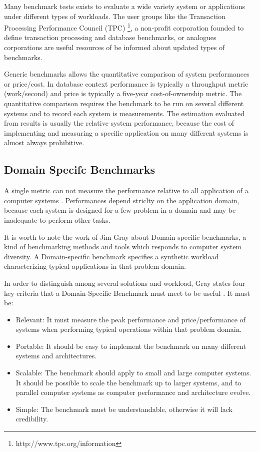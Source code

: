 Many benchmark tests exists to evaluate a wide variety system or applications under different types of workloads. The user groups like the Transaction Processing Performance Council (TPC) \footnote{http://www.tpc.org/information},  a non-profit corporation founded to define transaction processing and database benchmarks, or analogues corporations are useful resources of be informed about updated types of benchmarks. 

Generic benchmarks allows the quantitative comparison of system performances or price/cost. In database context performance is typically a throughput metric (work/second) and price is typically a five-year cost-of-ownership metric. The quantitative comparison requires the benchmark to be run on several different systems and to record each system is measurements.  The estimation evaluated from results is usually the relative system performance, because the cost of implementing and measuring a specific application on many different systems is almost always prohibitive.

\subsection{Domain Specifc Benchmarks}  \label{sec:tcp}

A single metric can not measure the performance relative to all application of a computer systems \cite{DBLP:books/mk/Gray93}. Performances depend striclty on the application domain, because each system is designed for a few problem in a domain and may be inadequate to perform other tasks.

It is worth to note the work of Jim Gray about Domain-specific benchmarks, a kind of benchmarking methods and tools  which responds to computer system diversity. A Domain-specific benchmark specifies a synthetic workload characterizing typical applications in that problem domain. 

In order to distinguish among several solutions and workload, Gray states four key criteria that a Domain-Specific Benchmark must meet to be useful \cite{DBLP:books/mk/Gray93}. It must be:
\begin{itemize}
\item Relevant: It must measure the peak performance and price/performance of systems when performing typical operations within that problem domain.
\item Portable: It should be easy to implement the benchmark on many different systems and architectures.
\item Scalable: The benchmark should apply to small and large computer systems. It should be possible to scale the benchmark up to larger systems, and to parallel computer systems as computer performance and architecture evolve.
\item Simple: The benchmark must be understandable, otherwise it will lack credibility.
\end{itemize} 

